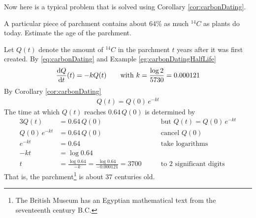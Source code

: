 Now here is a typical problem that is solved using Corollary
\ref{cor:carbonDating}.



\begin{eg}\label{eg:SDEcarbonDating}
A particular piece of parchment contains about 64\% as
much ${}^{14}C$ as plants do today.
Estimate the age of the parchment.

\soln
Let $Q(t)$ denote the amount of ${}^{14}C$ in the parchment
$t$ years after it was first created. By \eqref{eq:carbonDating} and
Example \ref{eg:carbonDatingHalfLife}
\begin{align*}
\diff{Q}{t}(t)=-k Q(t)\qquad\text{with }
k=\frac{\log 2}{5730} = 0.000121
\end{align*}
By Corollary \ref{cor:carbonDating}
\begin{align*}
Q(t) = Q(0)\, e^{-kt}
\end{align*}
The time at which $Q(t)$ reaches $0.64\,Q(0)$ is determined by
\begin{alignat*}{3}
Q(t)&=0.64\, Q(0) &\text{but $Q(t) = Q(0)\, e^{-kt}$} \\
Q(0)\,e^{-kt}&=0.64\, Q(0) &\text{cancel $Q(0)$} \\
e^{-kt}&=0.64&\text{take logarithms} \\
-kt&=\log 0.64 \\
t&=\frac{\log 0.64}{-k}
=\frac{\log 0.64}{-0.000121}
= 3700 \qquad&\text{to 2 significant digits}
\end{alignat*}
That is, the parchment\footnote{The British Museum has an
Egyptian mathematical text from the seventeenth century B.C.}
is about 37 centuries old.
\end{eg}

